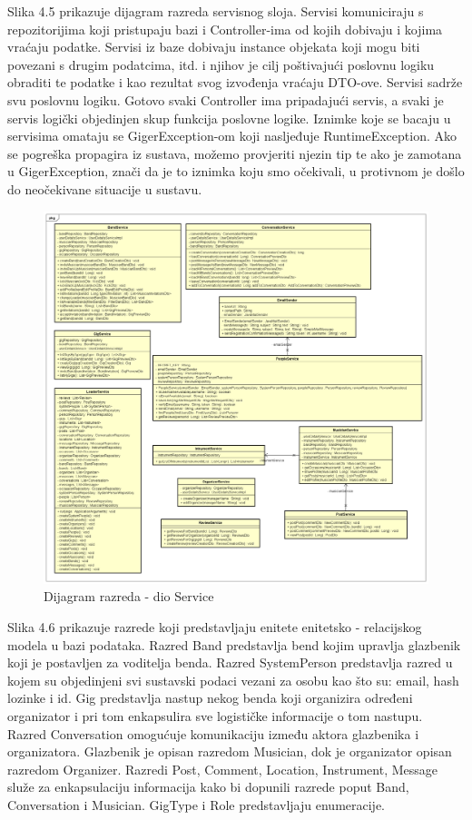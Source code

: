 		Slika 4.5 prikazuje dijagram razreda servisnog sloja. Servisi komuniciraju s repozitorijima koji pristupaju bazi i Controller-ima od kojih dobivaju i kojima vraćaju podatke. Servisi iz baze dobivaju instance objekata koji mogu biti povezani s drugim podatcima, itd. i njihov je cilj poštivajući poslovnu logiku obraditi te podatke i kao rezultat svog izvođenja vraćaju DTO-ove. Servisi sadrže svu poslovnu logiku. Gotovo svaki Controller ima pripadajući servis, a svaki je servis logički objedinjen skup funkcija poslovne logike. Iznimke koje se bacaju u servisima omataju se GigerException-om koji nasljeđuje RuntimeException. Ako se pogreška propagira iz sustava, možemo provjeriti njezin tip te ako je zamotana u GigerException, znači da je to iznimka koju smo očekivali, u protivnom je došlo do neočekivane situacije u sustavu.
		
		\begin{figure}[H]
			\begin{center}
				\includegraphics[width=16cm]{slike/service.PNG}
			\end{center}
			\caption{Dijagram razreda - dio Service}
			\label{fig:service}
		\end{figure}
	
	
	Slika 4.6 prikazuje razrede koji predstavljaju enitete enitetsko -  relacijskog modela u bazi podataka. Razred Band predstavlja bend kojim upravlja glazbenik koji je postavljen za voditelja benda. Razred SystemPerson predstavlja razred u kojem su objedinjeni svi sustavski podaci vezani za osobu kao što su: email, hash lozinke i id. Gig predstavlja  nastup nekog benda koji organizira određeni organizator i pri tom enkapsulira sve logističke informacije o tom nastupu. Razred Conversation omogućuje komunikaciju između aktora glazbenika i organizatora.
	Glazbenik je opisan razredom Musician, dok je organizator opisan razredom Organizer. Razredi Post, Comment, Location, Instrument, Message služe za enkapsulaciju informacija kako bi dopunili razrede poput Band, Conversation i Musician. GigType i Role predstavljaju enumeracije.
	
